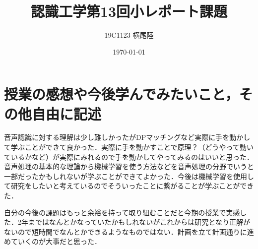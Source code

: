 \documentclass[dvipdfmx]{jsarticle}
\begin{document}
\title{認識工学第13回小レポート課題}
\author{19C1123 横尾陸}
\date{\today}
\maketitle

\section{授業の感想や今後学んでみたいこと，その他自由に記述}
音声認識に対する理解は少し難しかったがDPマッチングなど実際に手を動かして学ぶことができて良かった．実際に手を動かすことで原理？（どうやって動いているかなど）が実際にみれるので手を動かしてやってみるのはいいと思った．
音声処理の基本的な理論から機械学習を使う方法などを音声処理の分野でいうと一部だったかもしれないが学ぶことができてよかった．今後は機械学習を使用して研究をしたいと考えているのでそういったことに繋がることが学ぶことができた．

自分の今後の課題はもっと余裕を持って取り組むことだと今期の授業で実感した．2年まではなんとかなっていたかもしれないがこれからは研究となり正解がないので短時間でなんとかできるようなものではない．計画を立て計画通りに進めていくのが大事だと思った．
\end{document}
